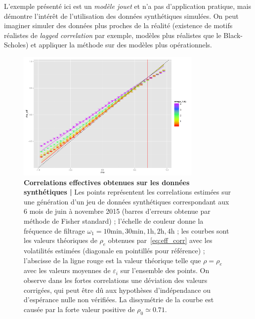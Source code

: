 L'exemple présenté ici est un \emph{modèle jouet} et n'a pas d'application pratique, mais démontre l'intérêt de l'utilisation des données synthétiques simulées. On peut imaginer simuler des données plus proches de la réalité (existence de motifs réalistes de \emph{lagged correlation} par exemple, modèles plus réalistes que le Black-Scholes) et appliquer la méthode sur des modèles plus opérationnels.




\begin{figure}[h!]
\centering
\vspace{-0.7cm}
\includegraphics[width=0.8\textwidth,height=0.3\textheight]{figures/effectiveCorrs_withGoodTh_A4}
\caption{\small\textbf{Correlations effectives obtenues sur les données synthétiques | } Les points représentent les correlations estimées sur une génération d'un jeu de données synthétiques correspondant aux 6 mois de juin à novembre 2015 (barres d'erreurs obtenue par méthode de Fisher standard) ; l'échelle de couleur donne la fréquence de filtrage $\omega_1=10\textrm{min},30\textrm{min},1\textrm{h},2\textrm{h},4\textrm{h}$ ; les courbes sont les valeurs théoriques de $\rho_e$ obtenues par~\ref{eq:eff_corr} avec les volatilités estimées (diagonale en pointillés pour référence) ; l'abscisse de la ligne rouge est la valeur théorique telle que $\rho = \rho_e$ avec les valeurs moyennes de $\varepsilon_i$ sur l'ensemble des points. On observe dans les fortes correlations une déviation des valeurs corrigées, qui peut être dû aux hypothèses d'indépendance ou d'espérance nulle non vérifiées. La dissymétrie de la courbe est causée par la forte valeur positive de $\rho_0 \simeq 0.71$.}
\label{fig:effective_corrs}
\end{figure}


